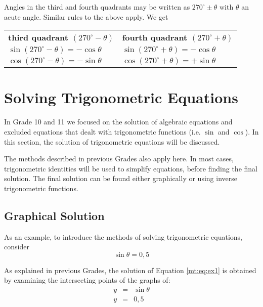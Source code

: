 {
Angles in the third and fourth quadrants may be written as $270^\circ \pm \theta$ with $\theta$ an acute angle. Similar rules to the above apply. We get
\begin{center}
\begin{tabular}{l|l}
\textbf{third quadrant $(270^\circ-\theta)$} & \textbf{fourth quadrant $(270^\circ+\theta)$} \\
 $\sin(270^\circ-\theta) = -\cos\theta$ & $\sin(270^\circ+\theta) = -\cos\theta$ \\
 $\cos(270^\circ-\theta) = -\sin\theta$ & $\cos(270^\circ+\theta) = +\sin\theta$ \\
\end{tabular}
\end{center}
} %


\section{Solving Trigonometric Equations}
\label{m:t11:e}


In Grade 10 and 11 we focused on the solution of algebraic equations and excluded equations that dealt with trigonometric functions (i.e. $\sin$ and $\cos$). In this section, the solution of trigonometric equations will be discussed. 

The methods described in previous Grades also apply here. 
In most cases, trigonometric identities will be used to simplify equations, before finding the final solution. The final solution can be found either graphically or using inverse trigonometric functions.

\subsection{Graphical Solution}
As an example, to introduce the methods of solving trigonometric equations, consider
\begin{equation}
\label{mt:eq:ex1}
\sin \theta = 0,5
\end{equation}

As explained in previous Grades,%
 the solution of Equation \ref{mt:eq:ex1} is obtained by examining the intersecting points of the graphs of:
\begin{eqnarray*}
y&=&\sin \theta\\
y&=&0,5
\end{eqnarray*}

